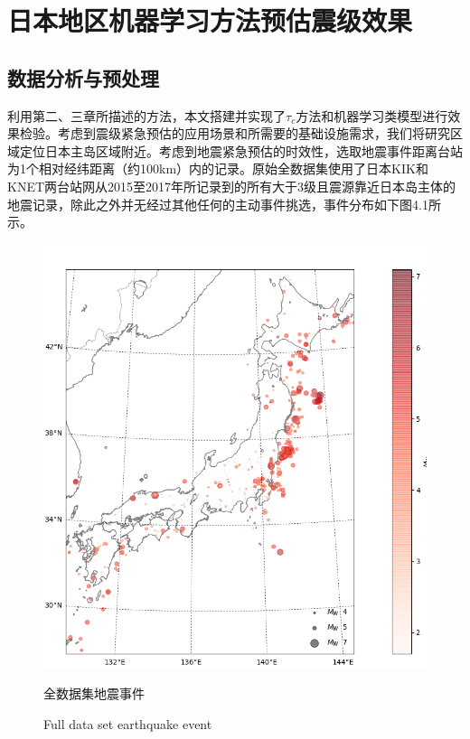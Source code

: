 \chapter{日本地区机器学习方法预估震级效果}
\section{数据分析与预处理}
\indent 利用第二、三章所描述的方法，本文搭建并实现了$\tau_{c}$方法和机器学习类模型进行效果检验。考虑到震级紧急预估的应用场景和所需要的基础设施需求，我们将研究区域定位日本主岛区域附近。考虑到地震紧急预估的时效性，选取地震事件距离台站为1个相对经纬距离（约100km）内的记录。原始全数据集使用了日本KIK和KNET两台站网从2015至2017年所记录到的所有大于3级且震源靠近日本岛主体的地震记录，除此之外并无经过其他任何的主动事件挑选，事件分布如下图4.1所示。\\
\begin{figure}[!h] 
\centering 
 \includegraphics[width=0.9\linewidth]{img/basemap.jpg} 
 \renewcommand{\figurename}{图} 
\caption{全数据集地震事件} 
\addtocounter{figure}{-1} \vspace{-5pt} 
\renewcommand{\figurename}{Fig} 
\caption{Full data set earthquake event} 
\renewcommand{\figurename}{图} 
\label{fig:network-device-influence.png} 
\end{figure}
